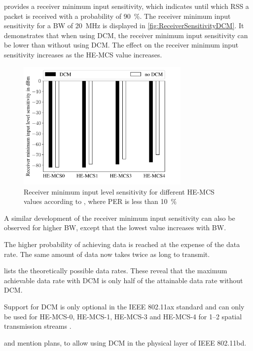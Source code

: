 \cite{noauthor_ieee_2021} provides a receiver minimum input sensitivity, which indicates until which RSS a packet is
received with a probability of \SI{90}{\percent}.
The receiver minimum input sensitivity for a \ac{BW} of
\SI{20}{\mega\hertz} is displayed in \autoref{fig:ReceiverSensitivityDCM}.
It demonstrates that when using \ac{DCM},
the receiver minimum input sensitivity can be lower than without using \ac{DCM}. The effect on the receiver minimum
input sensitivity increases as the HE-MCS value increases.
\begin{figure}%
	\centering
	\includegraphics[width=0.75\textwidth]{figures/Receiver_minimum_DCM}
	\caption{Receiver minimum input level sensitivity for different HE-MCS values according to \cite{noauthor_ieee_2021}, where \ac{PER} is less than \SI{10}{\percent}}%
	\label{fig:ReceiverSensitivityDCM}%
\end{figure}

A similar development of the receiver minimum input sensitivity can also be observed for higher \ac{BW}, except
that the lowest value increases with \ac{BW}.

The higher probability of achieving data is reached at the expense of the data rate.
The same amount of data now takes twice as long to transmit.

\cite{noauthor_ieee_2021} lists the theoretically possible data rates.
These reveal that the maximum achievable data rate with DCM is only half of the attainable data rate without DCM.

Support for \ac{DCM} is only optional in the IEEE 802.11ax standard and can only be used for HE-\ac{MCS}-\num{0},
HE-\ac{MCS}-\num{1}, HE-\ac{MCS}-\num{3} and HE-\ac{MCS}-\num{4} for \numrange{1}{2} spatial
transmission streams \cite{noauthor_ieee_2021}.

\textcite{jacob_system-level_2020} and \textcite{triwinarko_phy_2021} mention plans,
to allow using \ac{DCM} in the physical layer of IEEE 802.11bd.

